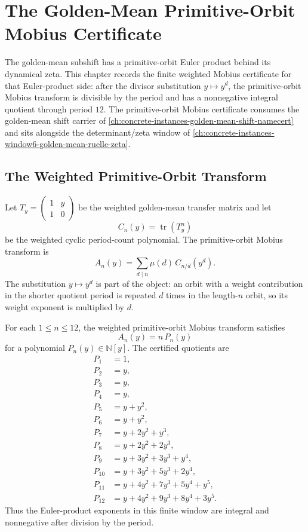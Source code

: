 \chapter{The Golden-Mean Primitive-Orbit Mobius Certificate}
\label{ch:concrete-instances-window6-golden-mean-primitive-orbit}

The golden-mean subshift has a primitive-orbit Euler product behind its dynamical zeta. This chapter records the finite weighted Mobius certificate for that Euler-product side: after the divisor substitution $y\mapsto y^d$, the primitive-orbit Mobius transform is divisible by the period and has a nonnegative integral quotient through period $12$. The primitive-orbit Mobius certificate consumes the golden-mean shift carrier of \autoref{ch:concrete-instances-golden-mean-shift-namecert} and sits alongside the determinant/zeta window of \autoref{ch:concrete-instances-window6-golden-mean-ruelle-zeta}.

\section{The Weighted Primitive-Orbit Transform}
\label{sec:window6-primitive-orbit-transform}

Let $T_y=\begin{pmatrix}1&y\\1&0\end{pmatrix}$ be the weighted golden-mean transfer matrix and let
$$
C_n(y)=\operatorname{tr}(T_y^n)
$$
be the weighted cyclic period-count polynomial. The primitive-orbit Mobius transform is
$$
A_n(y)=\sum_{d\mid n}\mu(d)\,C_{n/d}(y^d).
$$
The substitution $y\mapsto y^d$ is part of the object: an orbit with a weight contribution in the shorter quotient period is repeated $d$ times in the length-$n$ orbit, so its weight exponent is multiplied by $d$.

\begin{theorem}
\label{thm:window6-primitive-orbit-positivity}
For each $1\le n\le12$, the weighted primitive-orbit Mobius transform satisfies
$$
A_n(y)=n\,P_n(y)
$$
for a polynomial $P_n(y)\in\mathbb N[y]$. The certified quotients are
$$
\begin{aligned}
P_1&=1,\\
P_2&=y,\\
P_3&=y,\\
P_4&=y,\\
P_5&=y+y^2,\\
P_6&=y+y^2,\\
P_7&=y+2y^2+y^3,\\
P_8&=y+2y^2+2y^3,\\
P_9&=y+3y^2+3y^3+y^4,\\
P_{10}&=y+3y^2+5y^3+2y^4,\\
P_{11}&=y+4y^2+7y^3+5y^4+y^5,\\
P_{12}&=y+4y^2+9y^3+8y^4+3y^5.
\end{aligned}
$$
Thus the Euler-product exponents in this finite window are integral and nonnegative after division by the period.
\end{theorem}

